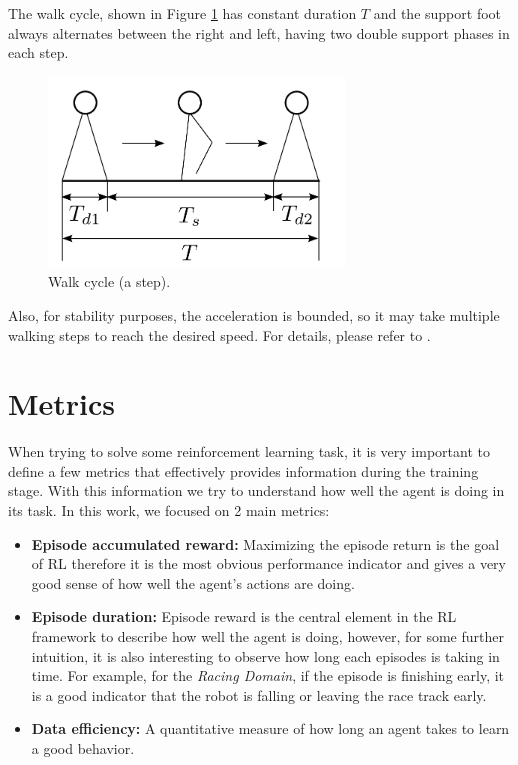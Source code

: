 The walk cycle, shown in Figure \ref{fig:walk_cycle} has constant duration $T$ and the support foot always alternates between
the right and left, having two double support phases in each step.

\begin{figure}[ht]
    \centering
    \includegraphics[width=0.7\textwidth]{Chapter5/humanoid_step.png}
    \caption{Walk cycle (a step).}
    \label{fig:walk_cycle}
\end{figure}

Also, for stability purposes, the acceleration is bounded, so it may take multiple walking steps to 
reach the desired speed. For details, please  refer to .

\section{Metrics}
\label{sec:metrics}

When trying to solve some reinforcement learning task, it is very important to define a few metrics
that effectively provides information during the training stage. With this information we try to understand
how well the agent is doing in its task.
In this work, we focused on 2 main metrics:

\begin{itemize}
    \item \textbf{Episode accumulated reward:} Maximizing the episode return is the goal of RL therefore
     it is the most obvious performance indicator and gives a very good sense of how well the agent's actions are doing.
    \item \textbf{Episode duration:} Episode reward is the central element in the RL framework to describe how
    well the agent is doing, however, for some further intuition, 
    it is also interesting to observe how long each episodes is taking in time.
    For example, for the \textit{Racing Domain}, if the episode is finishing early, it is a good indicator
    that the robot is falling or leaving the race track early.
    \item \textbf{Data efficiency:} A quantitative measure of how long an agent takes to learn a good behavior.
\end{itemize}

